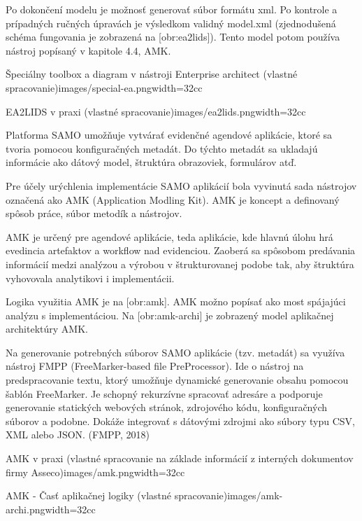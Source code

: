 Po dokončení modelu je možnosť generovať súbor formátu xml. Po kontrole a prípadných ručných úpravách je výsledkom validný model.xml (zjednodušená schéma fungovania je zobrazená na [obr:ea2lids]). Tento model potom používa nástroj popísaný v kapitole 4.4, AMK.

{Špeciálny toolbox a diagram v nástroji Enterprise architect (vlastné spracovanie)}{images/special-ea.png}{width=32cc}

{EA2LIDS v praxi (vlastné spracovanie)}{images/ea2lids.png}{width=32cc}

Platforma SAMO umožňuje vytvárať evidenčné agendové aplikácie, ktoré sa tvoria pomocou konfiguračných metadát. Do týchto metadát sa ukladajú informácie ako dátový model, štruktúra obrazoviek, formulárov atď.

Pre účely urýchlenia implementácie SAMO aplikácií bola vyvinutá sada nástrojov označená ako AMK (Application Modling Kit). AMK je koncept a definovaný spôsob práce, súbor metodík a nástrojov. 

AMK je určený pre agendové aplikácie, teda aplikácie, kde hlavnú úlohu hrá evedincia artefaktov a workflow nad evidenciou. Zaoberá sa spôsobom predávania informácií medzi analýzou a výrobou v štrukturovanej podobe tak, aby štruktúra vyhovovala analytikovi i implementácii.

Logika využitia AMK je na [obr:amk]. AMK možno popísať ako most spájajúci analýzu s implementáciou. Na [obr:amk-archi] je zobrazený model aplikačnej architektúry AMK.

Na generovanie potrebných súborov SAMO aplikácie (tzv. metadát) sa využíva nástroj FMPP (FreeMarker-based file PreProcessor). Ide o nástroj na predspracovanie textu, ktorý umožňuje dynamické generovanie obsahu pomocou šablón FreeMarker. Je schopný rekurzívne spracovať adresáre a podporuje generovanie statických webových stránok, zdrojového kódu, konfiguračných súborov a podobne. Dokáže integrovať s dátovými zdrojmi ako súbory typu CSV, XML alebo JSON. \scr(FMPP, 2018)

{AMK v praxi (vlastné spracovanie na základe informácií z interných dokumentov firmy Asseco)}{images/amk.png}{width=32cc}

{AMK - Časť aplikačnej logiky (vlastné spracovanie)}{images/amk-archi.png}{width=32cc}
%

